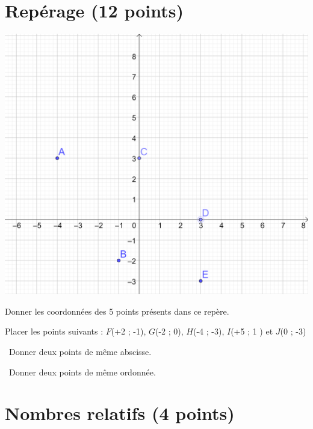 	\section{Repérage (12 points)}


\begin{center}
	\includegraphics[scale=0.135]{img/grille}
\end{center}

\begin{questions}
	
	\question[5] Donner les coordonnées des 5 points présents dans ce repère.
	\fillwithdottedlines{2cm}
	
	\question[5] Placer les points suivants :
	$F$(+2 ; -1), $G$(-2 ; 0),  $H$(-4 ; -3),  $I$(+5 ; 1 ) et  $J$(0 ; -3)
	
	
	\question[1]  Donner deux points de même abscisse.
	\fillwithdottedlines{1.5cm}
	\begin{solution}
		
	\end{solution}
	
	
	\question[2]  Donner deux points de même ordonnée.
	\fillwithdottedlines{1.5cm}
	\begin{solution}
		
	\end{solution}
	
	
\end{questions}
	
\section{Nombres relatifs (4 points)} 

